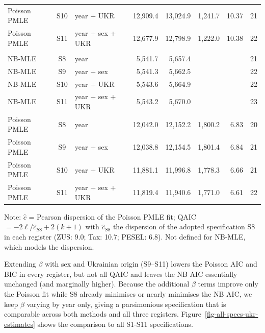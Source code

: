 \begin{table}[ht!]
\begin{tabular*}{\linewidth}{@{\extracolsep{\fill}}lclrrrrr}
Poisson PMLE & S10 & year + UKR & 12,909.4 & 13,024.9 & 1,241.7 & 10.37 & 21 \\ 
Poisson PMLE & S11 & year + sex + UKR & 12,677.9 & 12,798.9 & 1,222.0 & 10.38 & 22 \\ 
\midrule\addlinespace[2.5pt]
\multicolumn{8}{l}{PESEL} \\[2.5pt] 
\midrule\addlinespace[2.5pt]
NB-MLE & S8 & year & 5,541.7 & 5,657.4 &  &  & 21 \\ 
NB-MLE & S9 & year + sex & 5,541.3 & 5,662.5 &  &  & 22 \\ 
NB-MLE & S10 & year + UKR & 5,543.6 & 5,664.9 &  &  & 22 \\ 
NB-MLE & S11 & year + sex + UKR & 5,543.2 & 5,670.0 &  &  & 23 \\ 
Poisson PMLE & S8 & year & 12,042.0 & 12,152.2 & 1,800.2 & 6.83 & 20 \\ 
Poisson PMLE & S9 & year + sex & 12,038.8 & 12,154.5 & 1,801.4 & 6.84 & 21 \\ 
Poisson PMLE & S10 & year + UKR & 11,881.1 & 11,996.8 & 1,778.3 & 6.66 & 21 \\ 
Poisson PMLE & S11 & year + sex + UKR & 11,819.4 & 11,940.6 & 1,771.0 & 6.61 & 22 \\ 
\bottomrule
\end{tabular*}
\begin{minipage}{\linewidth}
\vspace{.05em}
Note: $\hat c$ = Pearson dispersion of the Poisson PMLE fit; QAIC $= -2\ell/\hat c_{S8} + 2(k+1)$ with $\hat c_{S8}$ the dispersion of the adopted specification S8 in each register (ZUS: 9.0; Tax: 10.7; PESEL: 6.8). Not defined for NB-MLE, which models the dispersion.\\
\end{minipage}
\end{table}


Extending $\beta$ with sex and Ukrainian origin (S9–S11) lowers the Poisson AIC and BIC in every register, but not all QAIC and leaves the NB AIC essentially unchanged (and marginally higher). Because the additional $\beta$ terms improve only the Poisson fit while S8 already minimises or nearly minimises the NB AIC, we keep $\beta$ varying by year only, giving a parsimonious specification that is comparable across both methods and all three registers. Figure~\ref{fig-all-specs-ukr-estimates} shows the comparison to all
S1-S11 specifications.


